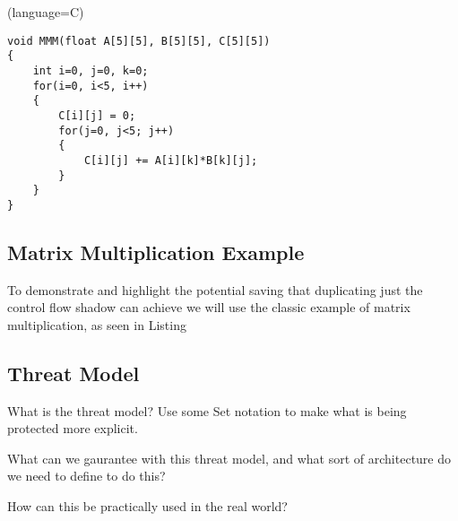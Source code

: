 \lstset(language=C)
\begin{lstlisting}[caption="Matrix Multiplication Example", label=lst:MMM]
void MMM(float A[5][5], B[5][5], C[5][5])
{
	int i=0, j=0, k=0;
	for(i=0, i<5, i++)
	{
		C[i][j] = 0;
		for(j=0, j<5; j++)
		{
			C[i][j] += A[i][k]*B[k][j];
		}
	} 
}
\end{lstlisting}

\subsection{Matrix Multiplication Example}
To demonstrate and highlight the potential saving that duplicating just
the control flow shadow can achieve we will use the classic example of
matrix multiplication, as seen in Listing  


\subsection{Threat Model}
What is the threat model?
Use some Set notation to make what is being protected more explicit.

What can we gaurantee with this threat model, and what sort of architecture
do we need to define to do this?

How can this be practically used in the real world?

